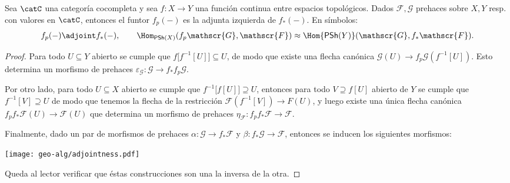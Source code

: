 \begin{prop}
	Sea $\catC$ una categoría cocompleta y sea $f \colon X \to Y$ una función continua entre espacios topológicos.
	Dados $\mathscr{F, G}$ prehaces sobre $X, Y$ resp. con valores en $\catC$, entonces el funtor $f_p(-)$ es la adjunta izquierda de $f_*(-)$.
	En símbolos:
	$$ f_p(-) \adjoint f_*(-), \qquad \Hom_{\mathsf{PSh}(X)} (f_p \mathscr{G}, \mathscr{F}) \approx \Hom{\mathsf{PSh}(Y)} (\mathscr{G}, f_* \mathscr{F}). $$
\end{prop}
\begin{proof}
	Para todo $U \subseteq Y$ abierto se cumple que $f\big[ f^{-1} [U ] \big] \subseteq U$, de modo que existe una flecha canónica
	$\mathscr{G}(U) \to f_p \mathscr{G}(f^{-1} [U ])$.
	Esto determina un morfismo de prehaces $\varepsilon_{\mathscr{G}} \colon \mathscr{G} \to f_* f_p \mathscr{G}$.

	Por otro lado, para todo $U \subseteq X$ abierto se cumple que $f^{-1}\big[ f [U ] \big] \supseteq U$, entonces para todo $V \supseteq f [U ]$
	abierto de $Y$ se cumple que $f^{-1} [V ] \supseteq U$ de modo que tenemos la flecha de la restricción $\mathscr{F}(f^{-1}[V ]) \to F (U )$,
	y luego existe una única flecha canónica $f_p f_* \mathscr{F} (U ) \to \mathscr{F} (U )$ que determina un morfismo
	de prehaces $\eta_{\mathscr{F}} \colon f_p f_* \mathscr{F} \to \mathscr{F}$.

	Finalmente, dado un par de morfismos de prehaces $\alpha \colon \mathscr{G} \to f_* \mathscr{F}$ y $\beta \colon f_*\mathscr{G} \to \mathscr{F}$,
	entonces se inducen los siguientes morfismos:
	\begin{center}
		\texttt{[image: geo-alg/adjointness.pdf]}
	\end{center}
	Queda al lector verificar que éstas construcciones son una la inversa de la otra.
\end{proof}

